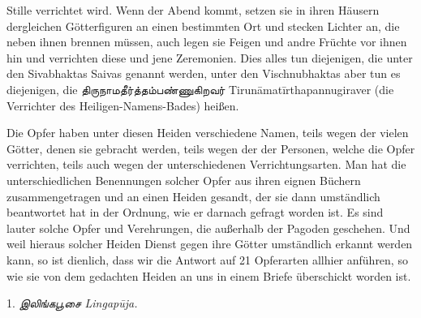 \documentclass{article}
\newcommand{\TamilText}[1]{\texttamil{#1}}
\newcommand{\tam}[1]{\TamilText{#1}}
\begin{document}
Stille verrichtet wird. Wenn der Abend kommt, setzen sie in ihren Häusern dergleichen Götterfiguren an einen bestimmten Ort und stecken Lichter an, die neben ihnen brennen müssen, auch legen sie Feigen und andre Früchte vor ihnen hin und verrichten diese und jene Zeremonien. Dies alles tun diejenigen, die unter den Sivabhaktas Saivas genannt werden, unter den Vischnubhaktas aber tun es diejenigen, die \tam{திருநாமதீர்த்தம்பண்ணுகிறவர்} Tirun\={a}mat\={i}rthapannugiraver (die Verrichter des Heiligen-Namens-Bades) heißen.

Die Opfer haben unter diesen Heiden verschiedene Namen, teils wegen der vielen Götter, denen sie gebracht werden, teils wegen der der Personen, welche die Opfer verrichten, teils auch wegen der unterschiedenen Verrichtungsarten. Man hat die unterschiedlichen Benennungen solcher Opfer aus ihren eignen Büchern zusammengetragen und an einen Heiden gesandt, der sie dann umständlich beantwortet hat in der Ordnung, wie er darnach gefragt worden ist. Es sind lauter solche Opfer und Verehrungen, die außerhalb der Pagoden geschehen. Und weil hieraus solcher Heiden Dienst gegen ihre Götter umständlich erkannt werden kann, so ist dienlich, dass wir die Antwort auf 21 Opferarten allhier anführen, so wie sie von dem gedachten Heiden an uns in einem Briefe überschickt worden ist.

\begin{center}
1. \emph{\tam{இலிங்கபூசை} Lingap\={u}ja.}
\end{center}
\end{document}
